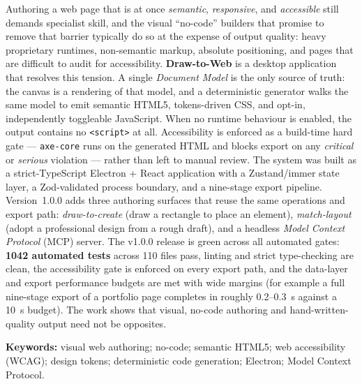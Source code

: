 
Authoring a web page that is at once \emph{semantic}, \emph{responsive}, and
\emph{accessible} still demands specialist skill, and the visual ``no-code''
builders that promise to remove that barrier typically do so at the expense of
output quality: heavy proprietary runtimes, non-semantic markup, absolute
positioning, and pages that are difficult to audit for accessibility.
\textbf{Draw-to-Web} is a desktop application that resolves this tension. A single
\emph{Document Model} is the only source of truth: the canvas is a rendering of
that model, and a deterministic generator walks the same model to emit semantic
HTML5, tokens-driven CSS, and opt-in, independently toggleable JavaScript. When no
runtime behaviour is enabled, the output contains no \texttt{<script>} at all.
Accessibility is enforced as a build-time hard gate --- \texttt{axe-core} runs on
the generated HTML and blocks export on any \emph{critical} or \emph{serious}
violation --- rather than left to manual review. The system was built as a
strict-TypeScript Electron + React application with a Zustand/immer state layer, a
Zod-validated process boundary, and a nine-stage export pipeline. Version~1.0.0
adds three authoring surfaces that reuse the same operations and export path:
\emph{draw-to-create} (draw a rectangle to place an element), \emph{match-layout}
(adopt a professional design from a rough draft), and a headless \emph{Model
Context Protocol} (MCP) server. The v1.0.0 release is green across all automated
gates: \textbf{1042 automated tests} across 110 files pass, linting and strict
type-checking are clean, the accessibility gate is enforced on every export path,
and the data-layer and export performance budgets are met with wide margins (for
example a full nine-stage export of a portfolio page completes in roughly
0.2--0.3~s against a 10~s budget). The work shows that visual, no-code authoring
and hand-written-quality output need not be opposites.

\vspace{0.6em}
\noindent\textbf{Keywords:} visual web authoring; no-code; semantic HTML5;
web accessibility (WCAG); design tokens; deterministic code generation; Electron;
Model Context Protocol.
